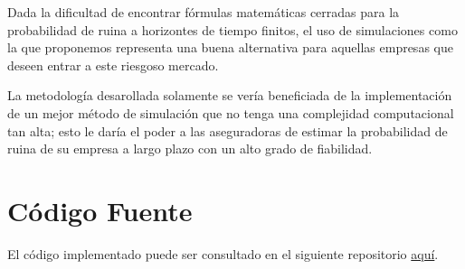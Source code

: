 \documentclass[journal]{IEEEtran}
\begin{document}
        Dada la dificultad de encontrar fórmulas matemáticas cerradas para la probabilidad de ruina a horizontes de tiempo finitos, el uso de simulaciones como la que proponemos representa una buena alternativa para aquellas empresas que deseen entrar a este riesgoso mercado.

        La metodología desarollada solamente se vería beneficiada de la implementación de un mejor método de simulación que no tenga una complejidad computacional tan alta; esto le daría el poder a las aseguradoras de estimar la probabilidad de ruina de su empresa a largo plazo con un alto grado de fiabilidad.
    
    \appendices

    \section{Código Fuente} \label{sec:source-code}

        El código implementado puede ser consultado en el siguiente repositorio \href{https://github.com/JuanEcheagaray75/ruin-model}{aquí}.

    \nocite{*}
    
    
    
\end{document}
